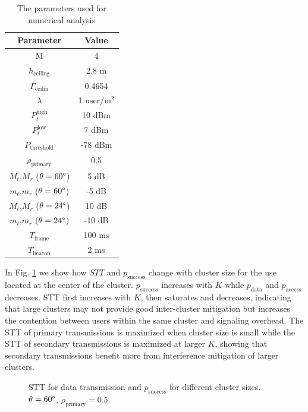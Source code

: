 \documentclass[10pt, conference, letterpaper]{IEEEtran}
\begin{document}
\begin{table}
	\centering
	\caption{The parameters used for numerical analysis}
	\begin{tabular}{cc}
		\hline
		Parameter & Value \\
		\hline
		M & 4 \\
		$h_{\mathrm{ceiling}}$ & 2.8 m \\
		$\Gamma_{\mathrm{ceilin}}$ & 0.4654 \\
		$\lambda$ & 1 $\mathrm{user/m^2}$ \\
		$P_t^{\mathrm{high}}$ & 10 dBm \\
		$P_t^{\mathrm{low}}$ & 7 dBm \\
		$P_{\mathrm{threshold}}$ & -78 dBm \\
		$\rho_{\mathrm{primary}}$ & 0.5 \\
		$M_t$,$M_r$ ($\theta = 60\degree$) & 5 dB \\
		$m_t$,$m_r$ ($\theta = 60\degree$) & -5 dB \\
		$M_t$,$M_r$ ($\theta = 24\degree$) & 10 dB \\
		$m_t$,$m_r$ ($\theta = 24\degree$) & -10 dB \\		
		$T_{\mathrm{frame}}$ & 100 ms \\
		$T_{\mathrm{beacon}}$ & 2 ms \\
		\hline
	\end{tabular}
	\label{tab:clusteranalysis:parameter}	
\end{table}

In Fig. \ref{fig:clusteranalysis:basic} we show how $STT$ and $p_{\mathrm{success}}$ change with cluster size for the use located at the center of the cluster.  $p_{\mathrm{success}}$ increases with $K$ while $p_{\mathrm{data}}$ and $p_{\mathrm{access}}$ decreases. STT first increases with $K$, then saturates and decreases, indicating that large clusters may not provide good inter-cluster mitigation but increases the contention between users within the same cluster and signaling overhead. The STT of primary transmissions is maximized when cluster size is small while the STT of secondary transmissions is maximized at larger $K$, showing that secondary transmissions benefit more from interference mitigation of larger clusters.  

\begin{figure}[htp]
	\centering
	
	
	\caption[]{STT for data transmission  and $p_{\mathrm{success}}$  for different cluster sizes. $\theta=60\degree$, $\rho_{\mathrm{primary}} = 0.5$. }
	\label{fig:clusteranalysis:basic}
\end{figure}
\end{document}
